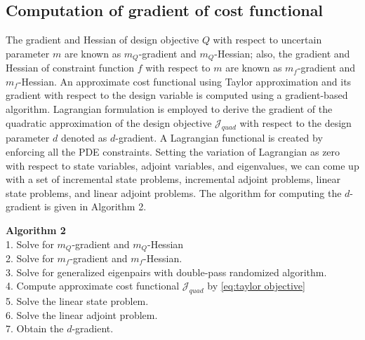 \documentclass[pdf-a,balance,colorlinks,upint,subscriptcorrection,varvw,mathalfa=cal=boondoxo, spanish,french,vietnamese,russian,greek]{asmeconf}
\begin{document}
\subsection{Computation of gradient of cost functional}
\noindent
The gradient and Hessian of design objective $Q$ with respect to uncertain parameter $m$ are known as $m_{Q}$-gradient and $m_{Q}$-Hessian; also, the gradient and Hessian of constraint function $f$ with respect to  $m$ are known as $m_{f}$-gradient and $m_{f}$-Hessian. 
An approximate cost functional using Taylor approximation and its gradient with respect to the design variable is computed using a gradient-based algorithm. Lagrangian formulation is employed to derive the gradient of the quadratic approximation of the design objective $\mathcal{J}_{quad}$ with respect to the design parameter $d$ denoted as $d$-gradient. A Lagrangian functional is created by enforcing all the PDE constraints.  Setting the variation of Lagrangian as zero with respect to state variables, adjoint variables, and eigenvalues, we can come up with a set of incremental state problems, incremental adjoint problems, linear state problems, and linear adjoint problems. The algorithm for computing the $d$-gradient is given in Algorithm 2.
\begin{algorithm}[H]
    \textbf{Algorithm 2}\\
    1. Solve for $m_{Q}$-gradient and $m_{Q}$-Hessian\vspace{0.03 in}\\
    2. Solve for $m_{f}$-gradient and $m_{f}$-Hessian.\vspace{0.03 in}\\
    3. Solve for generalized eigenpairs with double-pass randomized algorithm.\vspace{0.03 in}\\
    4. Compute approximate cost functional $\mathcal{J}_{quad}$ by \eqref{eq:taylor objective}\\
    5. Solve the linear state problem.\vspace{0.03 in}\\
    6. Solve the linear adjoint problem.\vspace{0.05 in}\\
    7. Obtain the $d$-gradient. 
\end{algorithm}


\end{document}

